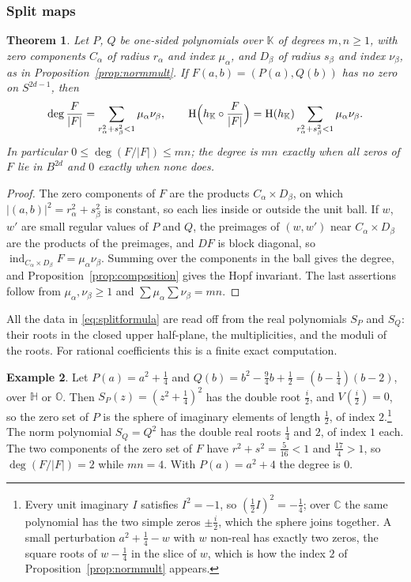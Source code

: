 \documentclass[11pt]{amsart}
\numberwithin{equation}{section}
\theoremstyle{plain}
\newtheorem{theorem}{Theorem}[section]
\theoremstyle{definition}
\newtheorem{example}[theorem]{Example}
\theoremstyle{remark}
\newcommand{\C}{\mathbb{C}}
\newcommand{\Hq}{\mathbb{H}}
\newcommand{\Oc}{\mathbb{O}}
\newcommand{\K}{\mathbb{K}}
\newcommand{\Hopf}{\mathrm{H}}
\begin{document}
\subsubsection{Split maps}

\begin{theorem}\label{thm:split}
Let $P$, $Q$ be one-sided polynomials over $\K$ of degrees $m,n\ge1$, with zero components $C_\alpha$ of radius $r_\alpha$ and index $\mu_\alpha$, and $D_\beta$ of radius $s_\beta$ and index $\nu_\beta$, as in Proposition~\ref{prop:normmult}. If $F(a,b)=(P(a),Q(b))$ has no zero on $S^{2d-1}$, then
\begin{equation}\label{eq:splitformula}
\deg\frac F{|F|}=\sum_{r_\alpha^2+s_\beta^2<1}\mu_\alpha\nu_\beta,\qquad \Hopf\Bigl(h_\K\circ\frac F{|F|}\Bigr)=\Hopf(h_\K)\sum_{r_\alpha^2+s_\beta^2<1}\mu_\alpha\nu_\beta .
\end{equation}
In particular $0\le\deg(F/|F|)\le mn$; the degree is $mn$ exactly when all zeros of $F$ lie in $B^{2d}$ and $0$ exactly when none does.
\end{theorem}

\begin{proof}
The zero components of $F$ are the products $C_\alpha\times D_\beta$, on which $|(a,b)|^2=r_\alpha^2+s_\beta^2$ is constant, so each lies inside or outside the unit ball. If $w$, $w'$ are small regular values of $P$ and $Q$, the preimages of $(w,w')$ near $C_\alpha\times D_\beta$ are the products of the preimages, and $DF$ is block diagonal, so $\operatorname{ind}_{C_\alpha\times D_\beta}F=\mu_\alpha\nu_\beta$. Summing over the components in the ball gives the degree, and Proposition~\ref{prop:composition} gives the Hopf invariant. The last assertions follow from $\mu_\alpha,\nu_\beta\ge1$ and $\sum\mu_\alpha\sum\nu_\beta=mn$.
\end{proof}

All the data in \eqref{eq:splitformula} are read off from the real polynomials $S_P$ and $S_Q$: their roots in the closed upper half-plane, the multiplicities, and the moduli of the roots. For rational coefficients this is a finite exact computation.

\begin{example}\label{ex:split}
Let $P(a)=a^2+\frac14$ and $Q(b)=b^2-\frac94b+\frac12=(b-\frac14)(b-2)$, over $\Hq$ or $\Oc$. Then $S_P(z)=(z^2+\frac14)^2$ has the double root $\frac i2$, and $V(\frac i2)=0$, so the zero set of $P$ is the sphere of imaginary elements of length $\frac12$, of index $2$.\footnote{Every unit imaginary $I$ satisfies $I^2=-1$, so $(\tfrac12I)^2=-\tfrac14$; over $\C$ the same polynomial has the two simple zeros $\pm\tfrac i2$, which the sphere joins together. A small perturbation $a^2+\tfrac14-w$ with $w$ non-real has exactly two zeros, the square roots of $w-\tfrac14$ in the slice of $w$, which is how the index $2$ of Proposition~\ref{prop:normmult} appears.} The norm polynomial $S_Q=Q^2$ has the double real roots $\frac14$ and $2$, of index $1$ each. The two components of the zero set of $F$ have $r^2+s^2=\frac5{16}<1$ and $\frac{17}4>1$, so $\deg(F/|F|)=2$ while $mn=4$. With $P(a)=a^2+4$ the degree is $0$.
\end{example}
\end{document}
